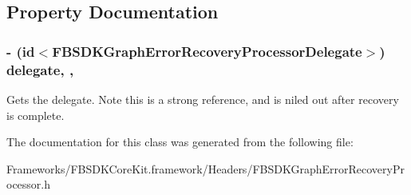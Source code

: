 \subsection{Property Documentation}
\hypertarget{interface_f_b_s_d_k_graph_error_recovery_processor_a3028da88a3e241fed8b263d99c207092}{}
\subsubsection[{delegate}]{\setlength{\rightskip}{0pt plus 5cm}-\/ (id$<${\bf F\+B\+S\+D\+K\+Graph\+Error\+Recovery\+Processor\+Delegate}$>$) delegate\hspace{0.3cm}{\ttfamily [read]}, {\ttfamily [nonatomic]}, {\ttfamily [strong]}}\label{interface_f_b_s_d_k_graph_error_recovery_processor_a3028da88a3e241fed8b263d99c207092}
Gets the delegate. Note this is a strong reference, and is nil\textquotesingle{}ed out after recovery is complete. 

The documentation for this class was generated from the following file\+:\begin{DoxyCompactItemize}
\item 
Frameworks/\+F\+B\+S\+D\+K\+Core\+Kit.\+framework/\+Headers/F\+B\+S\+D\+K\+Graph\+Error\+Recovery\+Processor.\+h\end{DoxyCompactItemize}
